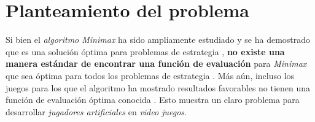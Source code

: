\section{Planteamiento del problema}
  Si bien el \textit{algoritmo Minimax} ha sido ampliamente estudiado y se ha demostrado que es una
  solución óptima para problemas de estrategia 
  \cite{v.neumannZurTheorieGesellschaftsspiele1928,fanMinimaxTheorems1953}, \textbf{no existe una 
  manera estándar de encontrar una función de evaluación} para \textit{Minimax} que sea óptima para 
  todos los problemas de estrategia \cite{dyerCS540Lecture}.
  Más aún, incluso los juegos para los que el algoritmo ha mostrado resultados favorables no tienen
  una función de evaluación óptima conocida \cite{shannonProgrammingComputerPlaying1988}.
  Esto muestra un claro problema para desarrollar \textit{jugadores artificiales} en \textit{video 
  juegos}.